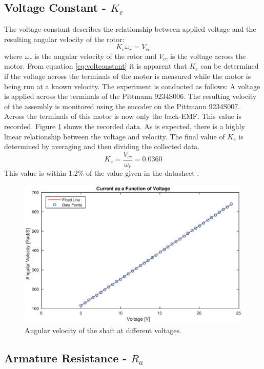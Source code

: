 \subsection{Voltage Constant - $K_e$}
\label{sec:voltconstat}
The voltage constant describes the relationship between applied voltage and the resulting angular velocity of the rotor:
\begin{equation}
	\label{eq:voltconstant}
	K_e\omega_r = V_{cc}
\end{equation}
where $\omega_r$ is the angular velocity of the rotor and $V_{cc}$ is the voltage across the motor.
From equation \ref{eq:voltconstant} it is apparent that $K_e$ can be determined if the voltage across the terminals of the motor is measured while the motor is being run at a known velocity.
The experiment is conducted as follows:
A voltage is applied across the terminals of the Pittmann 9234S006.
The resulting velocity of the assembly is monitored using the encoder on the Pittmann 9234S007.
Across the terminals of this motor is now only the back-EMF.
This value is recorded.
Figure \ref{fig:velvsvolt} shows the recorded data. 
As is expected, there is a highly linear relationship between the voltage and velocity.
The final value of $K_e$ is determined by averaging and then dividing the collected data.
$$K_e=\frac{V_{cc}}{\omega_r}=0.0360$$
This value is within 1.2\% of the value given in the datasheet \cite{pittmann}.

\begin{figure}[!h]
	\centering
	\includegraphics[width=.75\linewidth]{graphics/vvsrpm}
	\caption{Angular velocity of the shaft at different voltages.}
	\label{fig:velvsvolt}
\end{figure}

\subsection{Armature Resistance - $R_a$}
\label{sec:armature}
